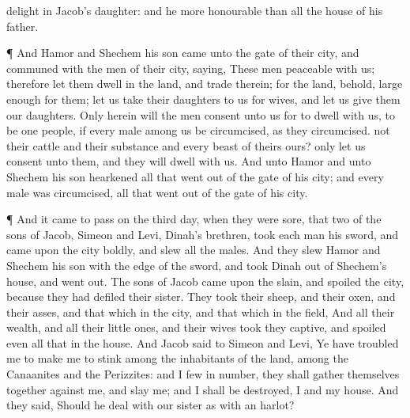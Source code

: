 {delight in
Jacob’s
daughter: and he
{} more
honourable than all the
house of his
father.
\par }{\PP {}¶ And
Hamor and
Shechem his
son
came unto the
gate of their
city, and
communed with the
men of their
city,
saying,
These
men
{}
peaceable
with us; therefore let them
dwell in the
land, and
trade therein; for the
land, behold,
{}
large
enough for
them; let us
take their
daughters to us for
wives, and let us
give them our
daughters.
Only
herein will the
men
consent unto us for to
dwell with us, to be
one
people, if every
male among us be
circumcised, as they
{}
circumcised.
 not their
cattle and their
substance and every
beast of theirs
{} ours? only let us
consent unto them, and they will
dwell with us.
And unto
Hamor and unto
Shechem his
son
hearkened all that went
out of the
gate of his
city; and every
male was
circumcised, all that went
out of the
gate of his
city.
\par }{\PP {}¶ And it came to pass on the
third
day, when they were
sore, that
two of the
sons of
Jacob,
Simeon and
Levi,
Dinah’s
brethren,
took each
man his
sword, and
came upon the
city
boldly, and
slew all the
males.
And they
slew
Hamor and
Shechem his
son with the
edge of the
sword, and
took
Dinah
out of
Shechem’s
house, and went
out.
The
sons of
Jacob
came upon the
slain, and
spoiled the
city, because they had
defiled their
sister.
They
took their
sheep, and their
oxen, and their
asses, and that which
{} in the
city, and that which
{} in the
field,
And all their
wealth, and all their little
ones, and their
wives took they
captive, and
spoiled even all that
{} in the
house.
And
Jacob
said to
Simeon and
Levi, Ye have
troubled me to make me to
stink among the
inhabitants of the
land, among the
Canaanites and the
Perizzites: and I
{}
few in
number, they shall gather themselves
together against me, and slay
me; and I shall be
destroyed, I and my
house.
And they
said, Should he
deal with our
sister as with an
harlot?

}
